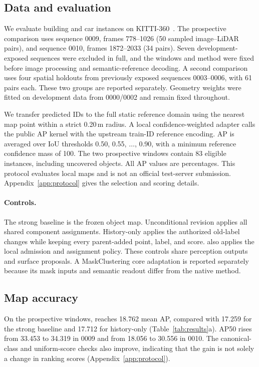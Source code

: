 \subsection{Data and evaluation}
We evaluate building and car instances on KITTI-360~\cite{kitti}. The prospective comparison uses sequence 0009, frames 778--1026 (50 sampled image--LiDAR pairs), and sequence 0010, frames 1872--2033 (34 pairs). Seven development-exposed sequences were excluded in full, and the windows and method were fixed before image processing and semantic-reference decoding. A second comparison uses four spatial holdouts from previously exposed sequences 0003--0006, with 61 pairs each. These two groups are reported separately. Geometry weights were fitted on development data from 0000/0002 and remain fixed throughout.

We transfer predicted IDs to the full static reference domain using the nearest map point within a strict 0.20\,m radius. A local confidence-weighted adapter calls the public AP kernel with the upstream train-ID reference encoding. AP is averaged over IoU thresholds 0.50, 0.55, $\ldots$, 0.90, with a minimum reference confidence mass of 100. The two prospective windows contain 83 eligible instances, including uncovered objects. All AP values are percentages. This protocol evaluates local maps and is not an official test-server submission. Appendix~\ref{app:protocol} gives the selection and scoring details.

\paragraph{Controls.}
The strong baseline is the frozen object map. Unconditional revision applies all shared component assignments. History-only applies the authorized old-label changes while keeping every parent-added point, label, and score. \ours{} also applies the local admission and assignment policy. These controls share perception outputs and surface proposals. A MaskClustering core adaptation is reported separately because its mask inputs and semantic readout differ from the native method.



\subsection{Map accuracy}
On the prospective windows, \ours{} reaches 18.762 mean AP, compared with 17.259 for the strong baseline and 17.712 for history-only (Table~\ref{tab:results}a). AP50 rises from 33.453 to 34.319 in 0009 and from 18.056 to 30.556 in 0010. The canonical-class and uniform-score checks also improve, indicating that the gain is not solely a change in ranking scores (Appendix~\ref{app:protocol}).

